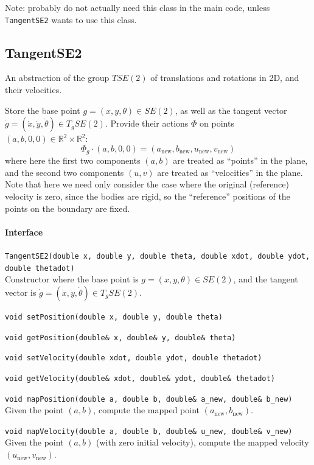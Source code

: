 \documentclass[11pt]{article}
\let\code\lstinline
\begin{document}
Note: probably do not actually need this class in the main code, unless \code|TangentSE2| wants to use this class.

\subsection{TangentSE2}
An abstraction of the group $TSE(2)$ of translations and rotations in 2D, and their velocities.

Store the base point $g=(x,y,\theta)\in SE(2)$, as well as the tangent vector $\dot g=(\dot x, \dot y, \dot\theta)\in T_g SE(2)$.  Provide their actions $\Phi$ on points $(a,b,0,0)\in\mathbb{R}^2\times\mathbb{R}^2$:
\[\Phi_g \cdot (a,b,0,0) = (a_\text{new},b_\text{new},u_\text{new},v_\text{new})\]
where here the first two components $(a,b)$ are treated as ``points'' in the plane, and the second two components $(u,v)$ are treated as ``velocities'' in the plane.  Note that here we need only consider the case where the original (reference) velocity is zero, since the bodies are rigid, so the ``reference'' positions of the points on the boundary are fixed.

\paragraph{Interface}
\begin{description}
	\item \code|TangentSE2(double x, double y, double theta, double xdot, double ydot, double thetadot)|\\
		Constructor where the base point is $g=(x,y,\theta)\in SE(2)$, and the tangent vector is $\dot g=(\dot x, \dot y, \dot\theta)\in T_g SE(2)$.
	\item \code|void setPosition(double x, double y, double theta)|
	\item \code|void getPosition(double& x, double& y, double& theta)|
	\item \code|void setVelocity(double xdot, double ydot, double thetadot)|
	\item \code|void getVelocity(double& xdot, double& ydot, double& thetadot)|
	\item \code|void mapPosition(double a, double b, double& a_new, double& b_new)|\\
		Given the point $(a,b)$, compute the mapped point $(a_\text{new},b_\text{new})$.
	\item \code|void mapVelocity(double a, double b, double& u_new, double& v_new)|\\
		Given the point $(a,b)$ (with zero initial velocity), compute the mapped velocity $(u_\text{new},v_\text{new})$.
 \end{description}






% 
% 
\end{document}

